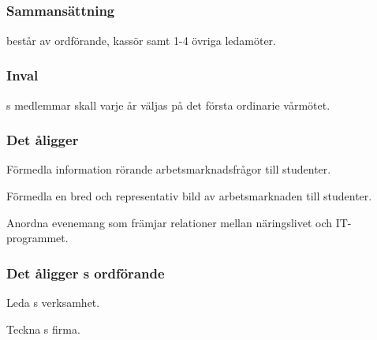 \subsection{\ARMITFULL{}}
\subsubsection{Sammansättning}
\ARMIT{} består av ordförande, kassör samt 1-4 övriga ledamöter.

\subsubsection{Inval}
\ARMIT{}s medlemmar skall varje år väljas på det första ordinarie vårmötet.

\subsubsection{Det åligger \ARMIT{}}
\begin{att}
	\item Förmedla information rörande arbetsmarknadsfrågor till studenter.
	\item Förmedla en bred och representativ bild av arbetsmarknaden till studenter.
	\item Anordna evenemang som främjar relationer mellan näringslivet och IT-programmet.
\end{att}

\subsubsection{Det åligger \ARMIT{}s ordförande}
\begin{att}
	\item Leda \ARMIT{}s verksamhet.
	\item Teckna \ARMIT{}s firma.
\end{att}

